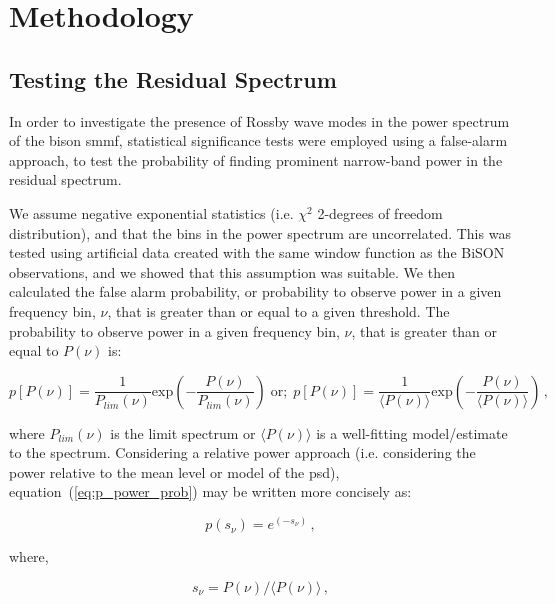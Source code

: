 \section{Methodology}\label{sec:r-mode_method}

\subsection{Testing the Residual Spectrum}
In order to investigate the presence of Rossby wave modes in the power spectrum of the \gls{bison} \gls{smmf}, statistical significance tests were employed using a false-alarm approach, to test the probability of finding prominent narrow-band power in the residual spectrum.

We assume negative exponential statistics (i.e. $\chi^2$ 2-degrees of freedom distribution), and that the bins in the power spectrum are uncorrelated. This was tested using artificial data created with the same window function as the BiSON observations, and we showed that this assumption was suitable. We then calculated the false alarm probability, or probability to observe power in a given frequency bin, $\nu$, that is greater than or equal to a given threshold. The probability to observe power in a given frequency bin, $\nu$, that is greater than or equal to $P(\nu)$ is:

\begin{equation}
p[P(\nu)] = \frac{1}{P_{lim}(\nu)} \mathrm{exp}\left(-\frac{P(\nu)}{P_{lim}(\nu)}\right) \; \mathrm{or; } \; p[P(\nu)] = \frac{1}{\langle P(\nu) \rangle} \mathrm{exp}\left(-\frac{P(\nu)}{\langle P(\nu) \rangle}\right) \, ,
\label{eq:p_power_prob}
\end{equation}


where $P_{lim}(\nu)$ is the limit spectrum or $\langle P(\nu) \rangle$ is a well-fitting model/estimate to the spectrum. Considering a relative power approach (i.e. considering the power relative to the mean level or model of the \gls{psd}), equation~(\ref{eq:p_power_prob}) may be written more concisely as:

\begin{equation}
p(s_{\nu}) = e^{(-s_{\nu})} \, ,
\label{eq:p_power_prob_concise}
\end{equation}

where,

\begin{equation}
s_{\nu} = P(\nu)/\langle P(\nu) \rangle \, ,
\label{eq:s_v}
\end{equation}


